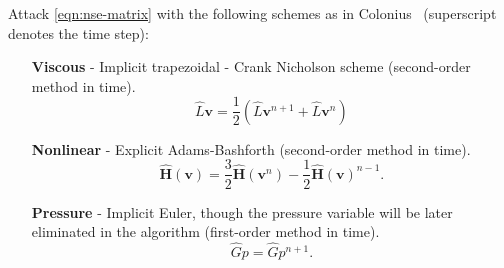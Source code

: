 \documentclass{article}
\numberwithin{equation}{section}
\begin{document}
Attack \cref{eqn:nse-matrix} with the following schemes as in Colonius~\cite{Colonius:2008} (superscript denotes the time step):
\begin{enumerate}
	\item[\textbf{Viscous}] - Implicit trapezoidal - Crank Nicholson scheme (second-order method in time).  
	\begin{equation}\label{eqn:viscous-crank-nicholson}
  		\hat{L}\boldsymbol{v}=\frac{1}{2}\left(\hat{L}\boldsymbol{v}^{n+1}+\hat{L}\boldsymbol{v}^n\right)
	\end{equation}

	\item[\textbf{Nonlinear}] - Explicit Adams-Bashforth (second-order method in time).
	\begin{equation}\label{eqn:nonlinear-adams-bashforth}
		\mathbf{\hat{H}}(\boldsymbol{v}) = \frac{3}{2}\mathbf{\hat{H}}(\boldsymbol{v}^{n}) - \frac{1}{2}\mathbf{\hat{H}}(\boldsymbol{v})^{n-1}.
	\end{equation}

	\item[\textbf{Pressure}] - Implicit Euler, though the pressure variable will be later eliminated in the algorithm (first-order method in time). 
	\begin{equation}\label{eqn:pressure-implicit-euler} 
		\hat{G}p = \hat{G}p^{n+1}.
	\end{equation}
\end{enumerate}
\end{document}
